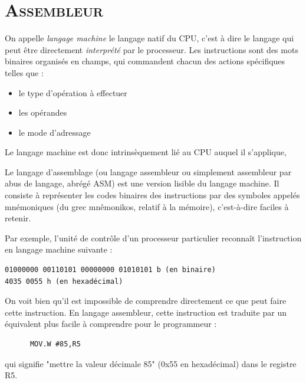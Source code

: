 \chapter{\textsc{Assembleur}}

On appelle \textit{langage machine} le langage natif du CPU, c'est à dire le langage qui peut être directement \textit{interprété} par le processeur. Les instructions sont des mots binaires organisés en champs, qui commandent chacun des actions spécifiques telles que :
\begin{itemize}[label=\textbullet,font=\small]
\item le type d'opération à effectuer
\item les opérandes
\item le mode d'adressage
\end{itemize}
Le langage machine est donc intrinsèquement lié au CPU auquel il s'applique,

Le langage d'assemblage (ou langage assembleur ou simplement assembleur par abus de
langage, abrégé ASM) est une version lisible du langage machine. Il consiste à représenter les codes binaires des instructions par des symboles appelés mnémoniques (du grec mnêmonikos, relatif à la mémoire), c'est-à-dire faciles à retenir.

Par exemple, l'unité de contrôle d'un processeur particulier reconnaît l'instruction en langage
machine suivante :


\lstset{style=customc}
\begin{lstlisting}
01000000 00110101 00000000 01010101 b (en binaire)
4035 0055 h (en hexadécimal)
\end{lstlisting}

On voit bien qu'il est impossible de comprendre directement ce que peut faire cette instruction.
En langage assembleur, cette instruction est traduite par un équivalent plus facile à comprendre
pour le programmeur :
\lstset{style=customc}
\begin{lstlisting}
      MOV.W #85,R5
\end{lstlisting}

qui signifie "mettre la valeur décimale 85" (0x55 en hexadécimal) dans le registre R5.

